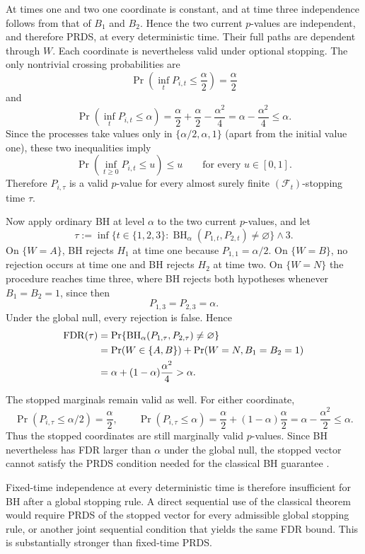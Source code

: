 \documentclass[11pt]{article}
\numberwithin{equation}{section}
\theoremstyle{plain}
\theoremstyle{definition}
\newcommand{\F}{\mathcal F}
\begin{document}
At times one and two one coordinate is constant, and at time three independence follows from that of $B_1$ and $B_2$. Hence the two current $p$-values are independent, and therefore PRDS, at every deterministic time. Their full paths are dependent through $W$. Each coordinate is nevertheless valid under optional stopping. The only nontrivial crossing probabilities are
\[
\Pr\left(\inf_t P_{i,t}\leq\frac{\alpha}{2}\right)
=\frac{\alpha}{2}
\]
and
\[
\Pr\left(\inf_t P_{i,t}\leq\alpha\right)
=
\frac{\alpha}{2}+\frac{\alpha}{2}
-\frac{\alpha^2}{4}
=
\alpha-\frac{\alpha^2}{4}
\leq\alpha.
\]
Since the processes take values only in $\{\alpha/2,\alpha,1\}$ (apart from the initial value one), these two inequalities imply
\[
\Pr\left(\inf_{t\geq0} P_{i,t}\leq u\right)\leq u
\qquad\text{for every }u\in[0,1].
\]
Therefore $P_{i,\tau}$ is a valid $p$-value for every almost surely finite $(\F_t)$-stopping time $\tau$.

Now apply ordinary BH at level $\alpha$ to the two current $p$-values,
and let
\[
\tau
:=
\inf\{t\in\{1,2,3\}:
\operatorname{BH}_\alpha(P_{1,t},P_{2,t})\neq\varnothing\}
\wedge3.
\]
On $\{W=A\}$, BH rejects $H_1$ at time one because $P_{1,1}=\alpha/2$. On $\{W=B\}$, no rejection occurs at time one and BH rejects $H_2$ at time two. On $\{W=N\}$ the procedure reaches time three, where BH rejects both hypotheses whenever $B_1=B_2=1$, since then
\[
P_{1,3}=P_{2,3}=\alpha.
\]
Under the global null, every rejection is false.  Hence
\begin{align}
	\operatorname{FDR}(\tau)
	&=
	\Pr\{\operatorname{BH}_\alpha(P_{1,\tau},P_{2,\tau})
	\neq\varnothing\} \notag\\
	&=
	\Pr(W\in\{A,B\})
	+
	\Pr(W=N,B_1=B_2=1) \notag\\
	&=
	\alpha+(1-\alpha)\frac{\alpha^2}{4}
	>\alpha.
	\label{eq:bh-stopping-counterexample}
\end{align}

The stopped marginals remain valid as well.
For either coordinate,
\[
\Pr(P_{i,\tau}\leq\alpha/2)=\frac{\alpha}{2},
\qquad
\Pr(P_{i,\tau}\leq\alpha)
=
\frac{\alpha}{2}
+(1-\alpha)\frac{\alpha}{2}
=
\alpha-\frac{\alpha^2}{2}
\leq\alpha.
\]
Thus the stopped coordinates are still marginally valid $p$-values. Since BH nevertheless has FDR larger than $\alpha$ under the global null, the stopped vector cannot satisfy the PRDS condition needed for the classical BH guarantee \citep{BenjaminiYekutieli2001}.

Fixed-time independence at every deterministic time is therefore insufficient for BH after a global stopping rule. A direct sequential use of the classical theorem would require PRDS of the stopped vector for every admissible global stopping rule, or another joint sequential condition that yields the same FDR bound. This is substantially stronger than fixed-time PRDS.
\end{document}
